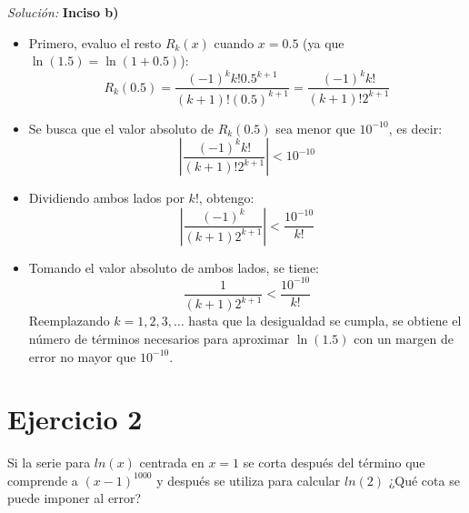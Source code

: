 \documentclass{article}
\newenvironment{solution}
    {\textit{Solución:}}
    {}
\begin{document}
\begin{solution}
    \textbf{Inciso b)}
    \begin{itemize}
        \item Primero, evaluo el resto $R_k(x)$ cuando $x = 0.5$ (ya que $\ln(1.5) = \ln(1 + 0.5)$):
        $$R_k(0.5) = \frac{(-1)^k k! 0.5^{k+1}}{(k+1)!(0.5)^{k+1}} = \frac{(-1)^k k!}{(k+1)!2^{k+1}}$$
        \item Se busca que el valor absoluto de $R_k(0.5)$ sea menor que $10^{-10}$, es decir:
        $$\left|\frac{(-1)^k k!}{(k+1)!2^{k+1}}\right| < 10^{-10}$$
        \item Dividiendo ambos lados por $k!$, obtengo:
        $$\left|\frac{(-1)^k}{(k+1)2^{k+1}}\right| < \frac{10^{-10}}{k!}$$
        \item Tomando el valor absoluto de ambos lados, se tiene:
        $$\frac{1}{(k+1)2^{k+1}} < \frac{10^{-10}}{k!}$$
        Reemplazando $k=1, 2, 3, \ldots$ hasta que la desigualdad se cumpla, se obtiene el número de términos necesarios para aproximar $\ln(1.5)$ con un margen de error no mayor que $10^{-10}$.
    \end{itemize}
\end{solution}

\newpage
\section*{Ejercicio 2}
Si la serie para $ln(x)$ centrada en $x = 1$ se corta después del término que comprende a $(x-1)^{1000}$ y después se utiliza para calcular $ln(2)$ ¿Qué cota se puede imponer al error?
\end{document}
